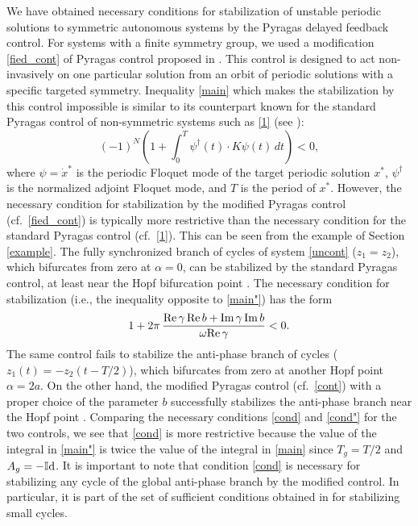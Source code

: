 \documentclass{article}
\begin{document}
We have obtained necessary conditions for stabilization of unstable periodic solutions to symmetric autonomous systems by the Pyragas delayed feedback control. For systems with a finite symmetry group, we used a modification \eqref{fied_cont} of Pyragas control proposed in \cite{fiedler_Z_2}. 
This control is designed to act non-invasively on one particular solution from an orbit of periodic solutions with a specific targeted symmetry.
Inequality \eqref{main} which makes the stabilization by this control impossible is similar to its counterpart known for the standard Pyragas control
of non-symmetric systems such as \eqref{1} (see \cite{hooton_amann}):
\begin{equation}\label{main"}
(-1)^N\left(1 + \int_{0}^{T}  \psi^\dagger (t)\cdot K \psi(t)\,dt\right)<0,
\end{equation}
where $\psi=\dot x^*$ is the periodic Floquet mode of the target periodic solution $x^*$, $\psi^\dagger$ is the normalized adjoint Floquet mode, and $T$ is the period of $x^*$.
However, the necessary condition for stabilization by the modified Pyragas control (cf.~\eqref{fied_cont}) is typically more restrictive than the necessary condition for the standard Pyragas control (cf.~\eqref{1}).
This can be seen from the example of Section \ref{example}. The fully synchronized branch of cycles of system \eqref{uncont} ($z_1=z_2$), which bifurcates from zero at $\alpha=0$, can be stabilized by the standard
Pyragas control, at least near the Hopf bifurcation point \cite{fiedler_Z_2}.
The necessary condition for stabilization (i.e., the inequality opposite to \eqref{main"}) has the form
\begin{equation}
\label{cond"}
1+2\pi\,\frac{{\rm Re} \, \gamma \, {\rm Re}\, b+ {\rm Im}\, \gamma \, {\rm Im}\, b}{ \omega{\rm Re }\, \gamma}  < 0.
\end{equation}
The same control fails to stabilize the anti-phase branch of cycles ($z_1(t)=-z_2(t-T/2)$), which bifurcates from zero at another Hopf point $\alpha=2a$.
On the other hand, the modified Pyragas control (cf.~\eqref{cont}) with a proper choice of the parameter $b$ successfully stabilizes the anti-phase branch near the Hopf point \cite{fiedler_Z_2}.
Comparing the necessary conditions \eqref{cond} and \eqref{cond"} for the two controls, we see that \eqref{cond} is more restrictive because the value of the integral in \eqref{main"}
is twice the value of the integral in \eqref{main} since $T_g=T/2$ and $A_g=-\mathbb{I}{\rm d}$.
It is important to note that condition \eqref{cond} is necessary for stabilizing any cycle of the global anti-phase branch by the modified control.
In particular, it is part of the set of sufficient conditions obtained in \cite{fiedler_Z_2} for stabilizing small cycles.
\end{document}
